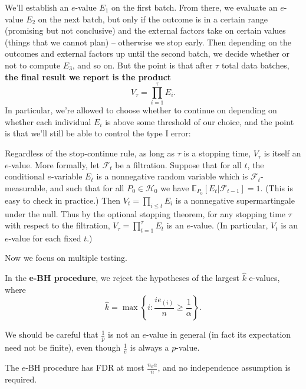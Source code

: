We'll establish an $e$-value $E_1$ on the first batch. From there, we evaluate an $e$-value $E_2$ on the next batch, but only if the outcome is in a certain range (promising but not conclusive) and the external factors take on certain values (things that we cannot plan) -- otherwise we stop early. Then depending on the outcomes and external factors up until the second batch, we decide whether or not to compute $E_3$, and so on. But the point is that after $\tau$ total data batches, \textbf{the final result we report is the product}
\[
V_\tau = \prod_{i=1}^{\tau} E_i.
\]
In particular, we're allowed to choose whether to continue on depending on whether each individual $E_i$ is above some threshold of our choice, and the point is that we'll still be able to control the type I error:

\begin{thm}
Regardless of the stop-continue rule, as long as $\tau$ is a stopping time, $V_\tau$ is itself an $e$-value. More formally, let $\mathcal{F}_t$ be a filtration. Suppose that for all $t$, the conditional $e$-variable $E_t$ is a nonnegative random variable which is $\mathcal{F}_t$-measurable, and such that for all $P_0 \in \mathcal{H}_0$ we have $\mathbb{E}_{P_0}[E_t | \mathcal{F}_{t-1}] = 1$. (This is easy to check in practice.) Then $V_t = \prod_{i \leq t} E_i$ is a nonnegative supermartingale under the null. Thus by the optional stopping theorem, for any stopping time $\tau$ with respect to the filtration, $V_\tau = \prod_{t=1}^{\tau} E_t$ is an $e$-value. (In particular, $V_t$ is an $e$-value for each fixed $t$.)
\end{thm}

Now we focus on multiple testing.
\begin{defn}
In the \textbf{e-BH procedure}, we reject the hypotheses of the largest $\hat{k}$ e-values, where
\[
\hat{k} = \max\left\{i : \frac{i e_{(i)}}{n} \geq \frac{1}{\alpha}\right\}.
\]
\end{defn}

\begin{rem}
We should be careful that $\frac{1}{p}$ is not an $e$-value in general (in fact its expectation need not be finite), even though $\frac{1}{e}$ is always a $p$-value.
\end{rem}

\begin{thm}
The $e$-BH procedure has FDR at most $\frac{n_0 \alpha}{n}$, and no independence assumption is required.
\end{thm}

